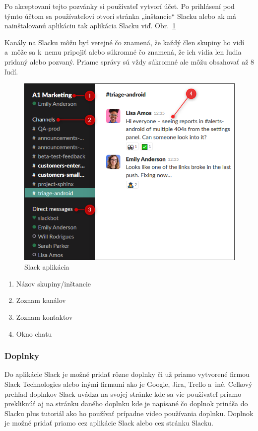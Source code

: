 \indent Po akceptovaní tejto pozvánky si používateľ vytvorí účet. Po prihlásení pod týmto účtom sa používateľovi otvorí stránka „inštancie“ Slacku alebo ak má nainštalovanú aplikáciu tak aplikácia Slacku viď. Obr.~\ref{fig:img-slack-app}

\indent Kanály na Slacku môžu byť verejné čo znamená, že každý člen skupiny ho vidí a môže sa k nemu pripojiť alebo súkromné čo znamená, že ich vidia len ľudia pridaný alebo pozvaný. Priame správy sú vždy súkromné ale môžu obsahovať až 8 ľudí.

\begin{figure}[H]
    \centering
    \includegraphics[scale=0.80]{img/obr1.png}
    \caption{Slack aplikácia}
    \label{fig:img-slack-app}
\end{figure}
\begin{enumerate}
    \centering
    \item Názov skupiny/inštancie
    \item Zoznam kanálov 
    \item Zoznam kontaktov
    \item Okno chatu
\end{enumerate}


\subsubsection{Doplnky}
\indent Do aplikácie Slack je možné pridať rôzne doplnky či už priamo vytvorené firmou Slack Technologies alebo inými firmami ako je Google, Jira, Trello a iné. Celkový prehľad doplnkov Slack uvádza na svojej stránke kde sa vie používateľ priamo prekliknúť aj na stránku daného doplnku kde je napísané čo doplnok prináša do Slacku plus tutoriál ako ho používať prípadne video používania doplnku. Doplnok je možné pridať priamo cez aplikácie Slack alebo cez stránku Slacku.

